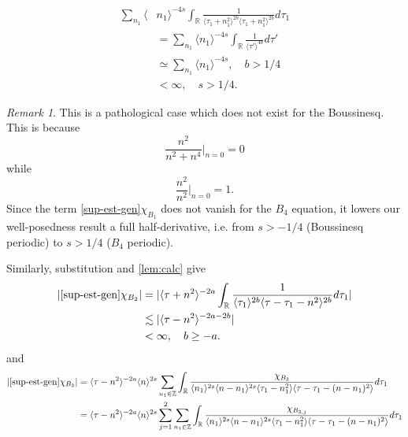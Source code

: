 \documentclass[12pt,reqno]{amsart}
\numberwithin{equation}{section}  %
\numberwithin{figure}{section}
\newcommand{\rr}{\mathbb{R}}
\newcommand{\zz}{\mathbb{Z}}
\theoremstyle{plain}
\theoremstyle{definition}
\theoremstyle{remark}
\newtheorem{remark}{Remark}
\begin{document}
%
%
%
\begin{equation*}
\begin{split}
   \sum_{n_{1}} \langle
  & n_{1}\rangle ^{-4s} \int_{\rr} \frac{1}{\langle \tau_{1} + n_{1}^{2} \rangle ^{2b}\langle
   \tau_{1} + n_{1}^{2}\rangle ^{2b}}d \tau_{1} 
   \\
   & = \sum_{n_{1}} \langle
  n_{1}\rangle ^{-4s} \int_{\rr} \frac{1}{\langle
   \tau' \rangle ^{4b}}d \tau'
   \\
   & \simeq \sum_{n_{1}} \langle n_{1} \rangle ^{-4s}, \quad b > 1/4
   \\
   & < \infty, \quad s > 1/4.
\end{split}
\end{equation*}
%
%
%
\begin{framed}
\begin{remark}
This is a pathological case which does not exist for the Boussinesq. This is
because  $$\frac{n^{2}}{n^{2} + n^{4}} |_{n=0} = 0$$ while
$$\frac{n^{2}}{n^{2}} |_{n=0} = 1.$$ Since the term
\eqref{sup-est-gen}$\chi_{B_{1}}$ does not vanish for the $B_4$ equation, it
lowers our well-posedness result a full half-derivative, i.e.
from $s > -1/4$ (Boussinesq periodic) to $s > 1/4$ ($B_{4}$ periodic). 
%
\end{remark}
\end{framed}
Similarly, substitution and \autoref{lem:calc} give
%
%
\begin{equation}
\begin{split}
  |  \eqref{sup-est-gen} \chi_{B_{2}}|
  & = | \langle \tau +n^{2} \rangle ^{-2a}\int_{\rr} \frac{1}{\langle \tau_{1}\rangle ^{2b}\langle
  \tau - \tau_{1} - n^{2} \rangle ^{2b}}d \tau_{1} |
  \\
  & \lesssim |  \langle \tau - n^{2} \rangle ^{-2a-2b} |
  \\
  & < \infty, \quad b \ge -a.
\end{split}
\end{equation}
and
%
%
\begin{equation*}
\begin{split}
  | \eqref{sup-est-gen} \chi_{B_{3}} |
  & = 
  \langle \tau - n^{2}  \rangle ^{-2a} \langle n
    \rangle ^{2s}
    \sum_{n_{1} \in \zz} \int_{\rr} \frac{\chi_{B_{3}}}{ \langle n_{1} \rangle ^{2s} \langle n-n_{1} \rangle ^{2s} 
\langle \tau_{1} - n_{1}^{2}  \rangle \langle  \tau - \tau_{1} - (n -
n_{1})^{2}  \rangle}
d \tau_1 
\\
& = \langle \tau - n^{2}  \rangle ^{-2a} \langle n
    \rangle ^{2s}
    \sum_{j=1}^{2} \sum_{n_{1} \in \zz} \int_{\rr} \frac{\chi_{B_{3,j}}}{ \langle n_{1} \rangle ^{2s} \langle n-n_{1} \rangle ^{2s} 
\langle \tau_{1} - n_{1}^{2}  \rangle \langle  \tau - \tau_{1} - (n -
n_{1})^{2}  \rangle}
d \tau_1 
\end{split}
\end{equation*}
\end{document}
